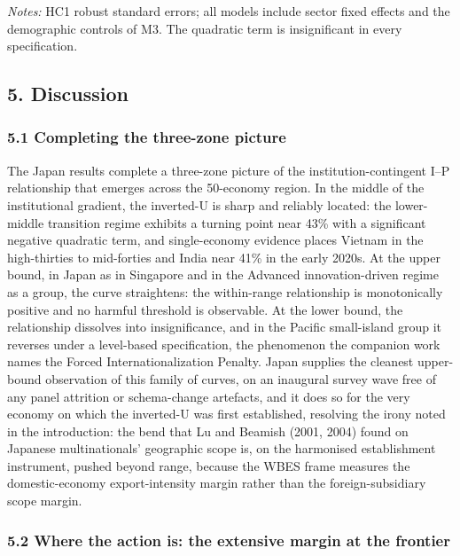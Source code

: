 \documentclass[
  12pt,a4paper]{article}
\begin{document}
\emph{Notes:} HC1 robust standard errors; all models include sector
fixed effects and the demographic controls of M3. The quadratic term is
insignificant in every specification.

\hypertarget{discussion}{%
\subsection{5. Discussion}\label{discussion}}

\hypertarget{completing-the-three-zone-picture}{%
\subsubsection{5.1 Completing the three-zone
picture}\label{completing-the-three-zone-picture}}

The Japan results complete a three-zone picture of the
institution-contingent I--P relationship that emerges across the
50-economy region. In the middle of the institutional gradient, the
inverted-U is sharp and reliably located: the lower-middle transition
regime exhibits a turning point near 43\% with a significant negative
quadratic term, and single-economy evidence places Vietnam in the
high-thirties to mid-forties and India near 41\% in the early 2020s. At
the upper bound, in Japan as in Singapore and in the Advanced
innovation-driven regime as a group, the curve straightens: the
within-range relationship is monotonically positive and no harmful
threshold is observable. At the lower bound, the relationship dissolves
into insignificance, and in the Pacific small-island group it reverses
under a level-based specification, the phenomenon the companion work
names the Forced Internationalization Penalty. Japan supplies the
cleanest upper-bound observation of this family of curves, on an
inaugural survey wave free of any panel attrition or schema-change
artefacts, and it does so for the very economy on which the inverted-U
was first established, resolving the irony noted in the introduction:
the bend that Lu and Beamish (2001, 2004) found on Japanese
multinationals' geographic scope is, on the harmonised establishment
instrument, pushed beyond range, because the WBES frame measures the
domestic-economy export-intensity margin rather than the
foreign-subsidiary scope margin.

\hypertarget{where-the-action-is-the-extensive-margin-at-the-frontier}{%
\subsubsection{5.2 Where the action is: the extensive margin at the
frontier}\label{where-the-action-is-the-extensive-margin-at-the-frontier}}
\end{document}
